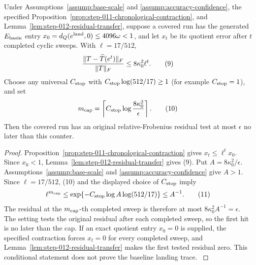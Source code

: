 \begin{proposition}\label{prop:step-012-stop-cap}
Under Assumptions~\ref{assump:base-scale} and
\ref{assump:accuracy-confidence}, the specified Proposition~\ref{prop:step-011-chronological-contraction}, and
Lemma~\ref{lem:step-012-residual-transfer}, suppose a covered run has the
generated \(E_{\rm basin}\) entry
\(x_0=d_Q(e^{\rm land},0)\le4096\omega<1\), and let \(x_t\) be its quotient
error after \(t\) completed cyclic sweeps. With \(\ell=17/512\),
\[
 { \|T-\widehat T(e^t)\|_F\over\|T\|_F}
 \le8\kappa_0^2\ell^t.
\tag{9}
\]
Choose any universal \(C_{\rm stop}\) with
\(C_{\rm stop}\log(512/17)\ge1\) (for example \(C_{\rm stop}=1\)), and set
\[
 m_{\rm cap}=\left\lceil C_{\rm stop}\log{8\kappa_0^2\over\epsilon}\right\rceil.
\tag{10}
\]
Then the covered run has an original relative-Frobenius residual test at most
\(\epsilon\) no later than this counter.

\begin{proof}
Proposition~\ref{prop:step-011-chronological-contraction} gives
\(x_t\le\ell^t x_0\). Since \(x_0<1\),
Lemma~\ref{lem:step-012-residual-transfer} gives (9). Put
\(A=8\kappa_0^2/\epsilon\). Assumptions~\ref{assump:base-scale} and
\ref{assump:accuracy-confidence} give \(A>1\). Since \(\ell=17/512\),
(10) and the displayed choice of \(C_{\rm stop}\) imply
\[
 \ell^{m_{\rm cap}}
 \le\exp\{-C_{\rm stop}\log A\log(512/17)\}\le A^{-1}.
\tag{11}
\]
The residual at the \(m_{\rm cap}\)-th completed sweep is therefore at most
\(8\kappa_0^2A^{-1}=\epsilon\). The setting tests the original residual after
each completed sweep, so the first hit is no later than the cap. If an exact
quotient entry \(x_0=0\) is supplied, the specified contraction forces
\(x_t=0\) for every completed sweep, and
Lemma~\ref{lem:step-012-residual-transfer} makes the first tested residual
zero. This conditional statement does not prove the baseline landing trace.
\(\)


\end{proof}
\end{proposition}
